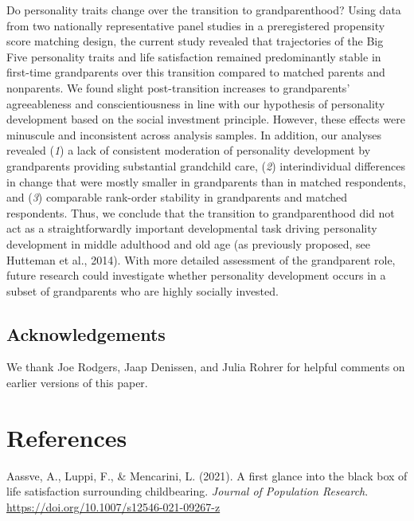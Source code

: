 \documentclass[
  english,
  man,floatsintext]{apa7}
\begin{document}
Do personality traits change over the transition to grandparenthood? Using data from two nationally representative panel studies in a preregistered propensity score matching design, the current study revealed that trajectories of the Big Five personality traits and life satisfaction remained predominantly stable in first-time grandparents over this transition compared to matched parents and nonparents. We found slight post-transition increases to grandparents' agreeableness and conscientiousness in line with our hypothesis of personality development based on the social investment principle. However, these effects were minuscule and inconsistent across analysis samples. In addition, our analyses revealed (\emph{1}) a lack of consistent moderation of personality development by grandparents providing substantial grandchild care, (\emph{2}) interindividual differences in change that were mostly smaller in grandparents than in matched respondents, and (\emph{3}) comparable rank-order stability in grandparents and matched respondents. Thus, we conclude that the transition to grandparenthood did not act as a straightforwardly important developmental task driving personality development in middle adulthood and old age (as previously proposed, see Hutteman et al., 2014). With more detailed assessment of the grandparent role, future research could investigate whether personality development occurs in a subset of grandparents who are highly socially invested.

\hypertarget{acknowledgements}{%
\subsection{Acknowledgements}\label{acknowledgements}}

We thank Joe Rodgers, Jaap Denissen, and Julia Rohrer for helpful comments on earlier versions of this paper.

\newpage

\hypertarget{references}{%
\section{References}\label{references}}

\begingroup
\setlength{\parindent}{-0.5in}
\setlength{\leftskip}{0.5in}

\hypertarget{refs}{}
\leavevmode\hypertarget{ref-aassveFirstGlanceBlack2021}{}%
Aassve, A., Luppi, F., \& Mencarini, L. (2021). A first glance into the black box of life satisfaction surrounding childbearing. \emph{Journal of Population Research}. \url{https://doi.org/10.1007/s12546-021-09267-z}
\end{document}
